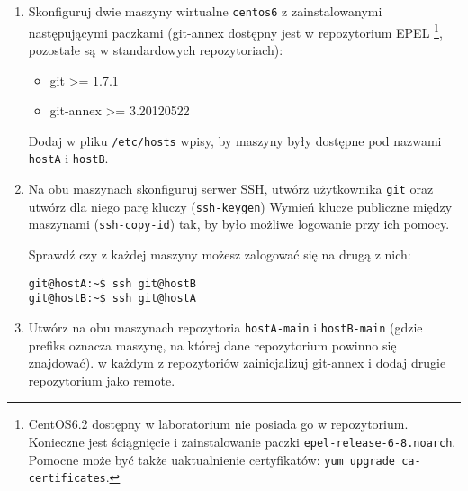 \documentclass[polish]{article}
\newif\ifteacher
\begin{document}
\begin{enumerate}

    \item
    Skonfiguruj dwie maszyny wirtualne \texttt{centos6} z zainstalowanymi
    następującymi paczkami (git-annex dostępny jest w repozytorium EPEL
    \footnote{CentOS6.2 dostępny w laboratorium nie posiada go w repozytorium.
        Konieczne jest ściągnięcie i zainstalowanie paczki
        \texttt{epel-release-6-8.noarch}. Pomocne może być także uaktualnienie
        certyfikatów: \texttt{yum upgrade ca-certificates}.},
    pozostałe są w standardowych repozytoriach):

    \begin{itemize}
      \item git >= 1.7.1
      \item git-annex >= 3.20120522
    \end{itemize}

    Dodaj w pliku \texttt{/etc/hosts} wpisy, by maszyny były dostępne pod
    nazwami \texttt{hostA} i \texttt{hostB}.

\ifteacher
    \begin{lstlisting}
yum upgrade ca-certificates

wget http://download.fedoraproject.org/pub/epel/6/x86_64/ \
     epel-release-6-8.noarch.rpm
rpm -ivh epel-release-6-8.noarch.rpm
    \end{lstlisting}
\fi

    \item
    Na obu maszynach skonfiguruj serwer SSH, utwórz użytkownika \texttt{git}
    oraz utwórz dla niego parę kluczy (\texttt{ssh-keygen}) Wymień klucze
    publiczne między maszynami (\texttt{ssh-copy-id}) tak, by było możliwe
    logowanie przy ich pomocy.

    Sprawdź czy z każdej maszyny możesz zalogować się na drugą z nich:

    \begin{lstlisting}
git@hostA:~$ ssh git@hostB
git@hostB:~$ ssh git@hostA
    \end{lstlisting}

    \item
    Utwórz na obu maszynach repozytoria \texttt{hostA-main} i
    \texttt{hostB-main} (gdzie prefiks oznacza maszynę, na której dane
    repozytorium powinno się znajdować). w każdym z repozytoriów zainicjalizuj
    git-annex i dodaj drugie repozytorium jako remote.


\end{enumerate}
\end{document}
